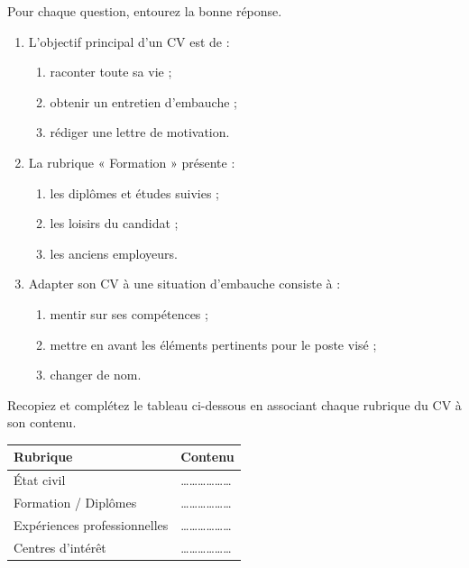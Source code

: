 \documentclass[11pt]{article}
\begin{document}
\begin{exercice}[QCM]
Pour chaque question, entourez la bonne réponse.
\begin{enumerate}
  \item L'objectif principal d'un CV est de :
  \begin{enumerate}
    \item raconter toute sa vie ;
    \item obtenir un entretien d'embauche ;
    \item rédiger une lettre de motivation.
  \end{enumerate}
  \item La rubrique « Formation » présente :
  \begin{enumerate}
    \item les diplômes et études suivies ;
    \item les loisirs du candidat ;
    \item les anciens employeurs.
  \end{enumerate}
  \item Adapter son CV à une situation d'embauche consiste à :
  \begin{enumerate}
    \item mentir sur ses compétences ;
    \item mettre en avant les éléments pertinents pour le poste visé ;
    \item changer de nom.
  \end{enumerate}
\end{enumerate}
\end{exercice}

\begin{exercice}
Recopiez et complétez le tableau ci-dessous en associant chaque rubrique du CV à son contenu.

\begin{center}
\begin{tabular}{|l|l|}
\hline
\textbf{Rubrique} & \textbf{Contenu} \\
\hline
État civil & \ldots\ldots\ldots\ldots\ldots\ldots \\
\hline
Formation / Diplômes & \ldots\ldots\ldots\ldots\ldots\ldots \\
\hline
Expériences professionnelles & \ldots\ldots\ldots\ldots\ldots\ldots \\
\hline
Centres d'intérêt & \ldots\ldots\ldots\ldots\ldots\ldots \\
\hline
\end{tabular}
\end{center}
\end{exercice}
\end{document}
